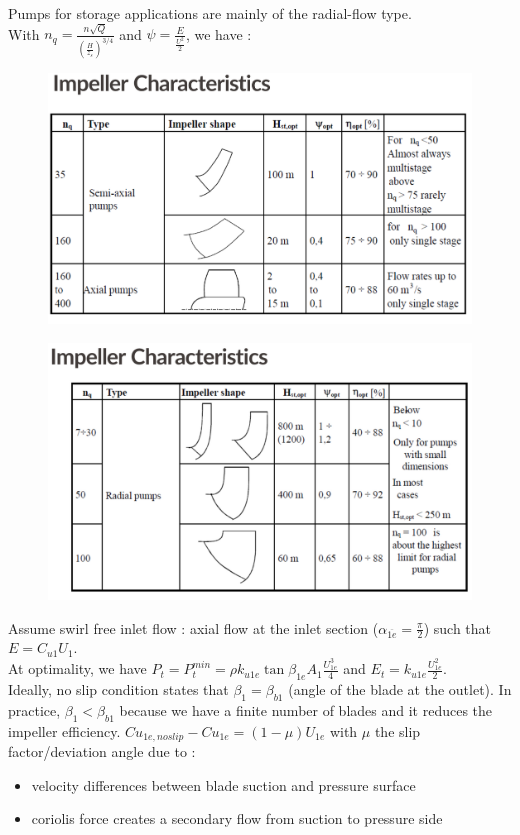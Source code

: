\documentclass[../main.tex]{subfiles}
\begin{document}
Pumps for storage applications are mainly of the radial-flow type.\\
With $n_q = \frac{n \sqrt{Q}}{(\frac{H}{z_s})^{3/4}}$ and $\psi = \frac{E}{\frac{U^2}{2}}$, we have :\\

\begin{figure}[hbt!]
    \centering
    \includegraphics[width=0.8\linewidth]{IMAGES/Hydraulic/Screenshot 2024-11-21 at 10.36.50.jpeg.png}
\end{figure}

\begin{figure}[hbt!]
    \centering
    \includegraphics[width=0.8\linewidth]{IMAGES/Hydraulic/Screenshot 2024-11-21 at 10.37.29.png}
\end{figure}

Assume swirl free inlet flow : axial flow at the inlet section ($\alpha_{\overline{1e}} = \frac{\pi}{2}$) such that $E = C_{u1} U_1$.\\
At optimality, we have $P_t = P_t^{min} = \rho k_{u1e} \tan\beta_{1e} A_1 \frac{U_{1e}^3}{4}$ and $E_t = k_{u1e} \frac{U_{1e}^2}{2}$.\\
Ideally, no slip condition states that $\beta_1 = \beta_{b1}$ (angle of the blade at the outlet). In practice, $\beta_1 < \beta_{b1}$ because we have a finite number of blades and it reduces the impeller efficiency. $Cu_{1e,noslip} - Cu_{1e} = (1-\mu) U_{1e}$ with $\mu$ the slip factor/deviation angle due to : \begin{itemize}
    \item velocity differences between blade suction and pressure surface
    \item coriolis force creates a secondary flow from suction to pressure side
\end{itemize}
\end{document}
